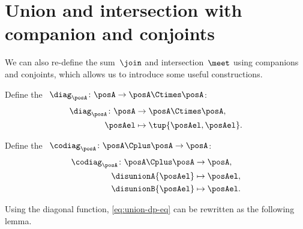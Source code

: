 
\section[Companion and conjoint use]{Union and intersection with companion and conjoints}

We can also re-define the sum~$\join$ and intersection~$\meet$ using companions and conjoints, which allows us to introduce some useful constructions.

\begin{definition}
    \label{def:diagonal-function}
    Define the \emph{}~$\diag_\posA\colon \posA \to {\posA \Ctimes \posA}$:
    \begin{equation}
        \begin{aligned}
            \diag_\posA \colon \posA & \to {\posA \Ctimes \posA}, \\
            \posAel                  & \mapsto \tup{\posAel, \posAel}.
        \end{aligned}
    \end{equation}
\end{definition}

\begin{definition}
    \label{def:codiagonal-function}
    Define the \emph{}~$\codiag_\posA\colon \posA \Cplus \posA \to \posA $:
    \begin{equation}
        \begin{aligned}
            \codiag_\posA \colon \posA \Cplus \posA & \to \posA, \\
            \disunionA{\posAel}                     & \mapsto \posAel, \\
            \disunionB{\posAel}                     & \mapsto \posAel.
        \end{aligned}
    \end{equation}
\end{definition}

Using the diagonal function, \cref{eq:union-dp-eq} can be rewritten as the following lemma.

